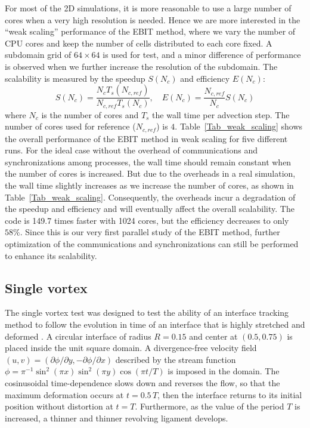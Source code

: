 For most of the 2D simulations, it is more reasonable to use a large number of cores when a very high resolution is needed. Hence we are more interested in the ``weak scaling'' performance of the EBIT method, where we vary the number of CPU cores and keep the number of cells distributed to each core fixed. A subdomain grid of $64 \times 64$ is used for test, and a minor difference of performance is observed when we further increase the resolution of the subdomain. The scalability is measured by the speedup $S(N_c)$ and efficiency $E(N_c)$:
\begin{equation}
S(N_c) = \frac{N_c T_s (N_{c,ref})}{N_{c, ref} T_s (N_c)}, \quad E(N_c) = \frac{N_{c,ref} }{N_c} S (N_c)
\label{Eq_speedup}
\end{equation}
where $N_c$ is the number of cores and $T_s$ the wall time per advection step. The number of cores used for reference ($N_{c, ref}$) is $4$. Table~\ref{Tab_weak_scaling} shows the overall performance of the EBIT method in weak scaling for five different runs.
For the ideal case without the overhead of communications and synchronizations among processes, the wall time should remain constant when the number of cores is increased. But due to the overheads in a real simulation, the wall time slightly increases as we increase the number of cores, as shown in Table~\ref{Tab_weak_scaling}. Consequently, the overheads incur a degradation of the speedup and efficiency and will eventually affect the overall scalability. The code is 149.7 times faster with 1024 cores, but the efficiency decreases to only $58\%$. Since this is our very first parallel study of the EBIT method, further optimization of the communications and synchronizations can still be performed to enhance its scalability.

\subsection{Single vortex}

The single vortex test was designed to test the ability of an interface tracking method to follow the evolution in time of an interface that is highly stretched and deformed \cite{Rider_1998_141}. A circular interface of radius $R=0.15$ and center at $(0.5, 0.75)$ is placed inside the unit square domain. 
A divergence-free velocity field $(u, v) = (\partial \phi \big/ \partial y, - \partial \phi \big/ \partial x)$ described by the stream function $\phi = \pi^{-1} \sin^2(\pi x) \sin^2(\pi y) \cos(\pi t/T)$ is imposed in the domain. The cosinusoidal time-dependence slows down and reverses the flow, so that the maximum deformation occurs at $t = 0.5\,T$, then the interface returns to its initial position without distortion at $t = T$. Furthermore, as the value of the period $T$ is increased, a thinner and thinner revolving ligament develops.

